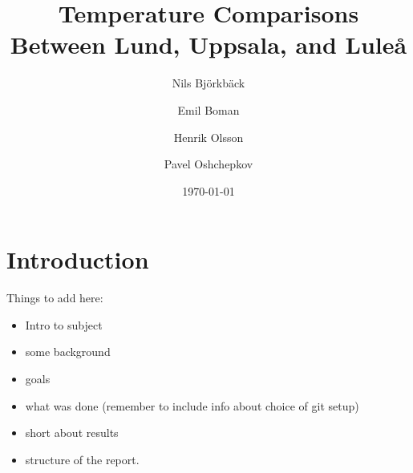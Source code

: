 \documentclass[aps,prl,groupedaddress,twocolumn]{revtex4-1}
\begin{document}

\title{Temperature Comparisons Between Lund, Uppsala, and Luleå}


\author{Nils Björkbäck}
\author{Emil Boman}
\author{Henrik Olsson}
\author{Pavel Oshchepkov}


\date{\today}

\begin{abstract}

\end{abstract}

\maketitle

\section{\label{intro}Introduction}
Things to add here:
\begin{itemize}\setlength\itemsep{-0.2cm}
    \item Intro to subject
    \item some background
    \item goals
    \item what was done (remember to include info about choice of git setup)
    \item short about results
    \item structure of the report.
\end{itemize}
\end{document}
